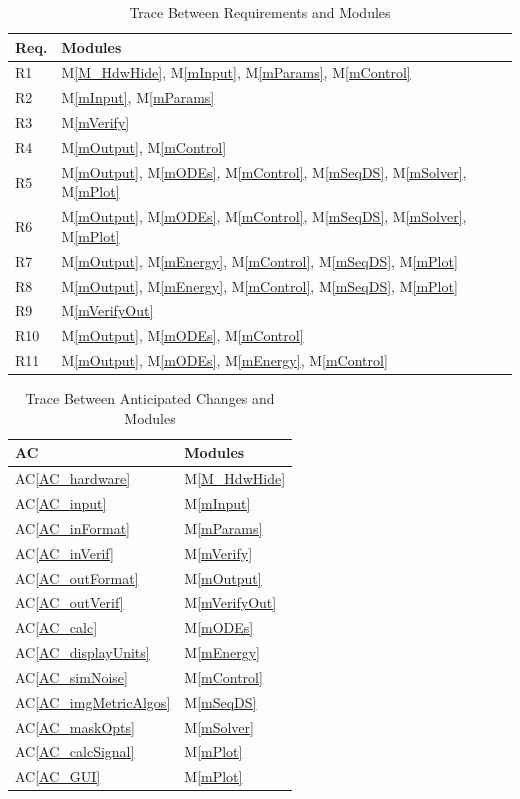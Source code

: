 \documentclass[12pt, titlepage]{article}
\newcommand{\acref}[1]{AC\ref{#1}}
\newcommand{\mref}[1]{M\ref{#1}}
\begin{document}
\begin{table}[H]
\centering
\begin{tabular}{p{} p{}}
\toprule
\textbf{Req.} & \textbf{Modules}\\
\midrule
R1 & \mref{M_HdwHide}, \mref{mInput}, \mref{mParams}, \mref{mControl}\\
R2 & \mref{mInput}, \mref{mParams}\\
R3 & \mref{mVerify}\\
R4 & \mref{mOutput}, \mref{mControl}\\
R5 & \mref{mOutput}, \mref{mODEs}, \mref{mControl}, \mref{mSeqDS}, \mref{mSolver}, \mref{mPlot}\\
R6 & \mref{mOutput}, \mref{mODEs}, \mref{mControl}, \mref{mSeqDS}, \mref{mSolver}, \mref{mPlot}\\
R7 & \mref{mOutput}, \mref{mEnergy}, \mref{mControl}, \mref{mSeqDS}, \mref{mPlot}\\
R8 & \mref{mOutput}, \mref{mEnergy}, \mref{mControl}, \mref{mSeqDS}, \mref{mPlot}\\
R9 & \mref{mVerifyOut}\\
R10 & \mref{mOutput}, \mref{mODEs}, \mref{mControl}\\
R11 & \mref{mOutput}, \mref{mODEs}, \mref{mEnergy}, \mref{mControl}\\
\bottomrule
\end{tabular}
\caption{Trace Between Requirements and Modules}
\label{TblRT}
\end{table}

\begin{table}[H]
\centering
\begin{tabular}{p{} p{}}
\toprule
\textbf{AC} & \textbf{Modules}\\
\midrule
\acref{AC_hardware} & \mref{M_HdwHide}\\
\acref{AC_input} & \mref{mInput}\\
\acref{AC_inFormat} & \mref{mParams}\\
\acref{AC_inVerif} & \mref{mVerify}\\
\acref{AC_outFormat} & \mref{mOutput}\\
\acref{AC_outVerif} & \mref{mVerifyOut}\\
\acref{AC_calc} & \mref{mODEs}\\
\acref{AC_displayUnits} & \mref{mEnergy}\\
\acref{AC_simNoise} & \mref{mControl}\\
\acref{AC_imgMetricAlgos} & \mref{mSeqDS}\\
\acref{AC_maskOpts} & \mref{mSolver}\\
\acref{AC_calcSignal} & \mref{mPlot}\\
\acref{AC_GUI} & \mref{mPlot}\\
\bottomrule
\end{tabular}
\caption{Trace Between Anticipated Changes and Modules}
\label{TblACT}
\end{table}
\end{document}
